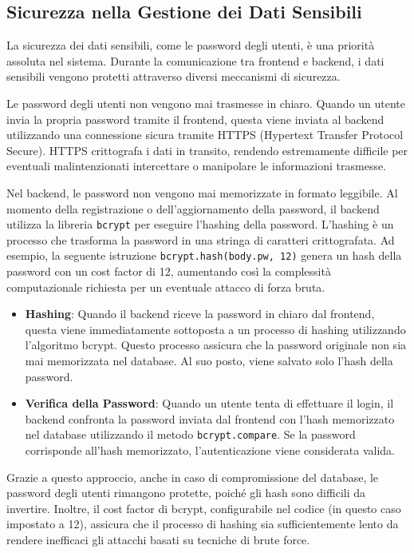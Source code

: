 \documentclass[twoside]{supsistudent}
\begin{document}
\subsection{Sicurezza nella Gestione dei Dati Sensibili}

La sicurezza dei dati sensibili, come le password degli utenti, è una priorità assoluta nel sistema. Durante la comunicazione tra frontend e backend, i dati sensibili vengono protetti attraverso diversi meccanismi di sicurezza.

Le password degli utenti non vengono mai trasmesse in chiaro. Quando un utente invia la propria password tramite il frontend, questa viene inviata al backend utilizzando una connessione sicura tramite HTTPS (Hypertext Transfer Protocol Secure). HTTPS crittografa i dati in transito, rendendo estremamente difficile per eventuali malintenzionati intercettare o manipolare le informazioni trasmesse.

Nel backend, le password non vengono mai memorizzate in formato leggibile. Al momento della registrazione o dell'aggiornamento della password, il backend utilizza la libreria \texttt{bcrypt} per eseguire l'hashing della password. L'hashing è un processo che trasforma la password in una stringa di caratteri crittografata. Ad esempio, la seguente istruzione \texttt{bcrypt.hash(body.pw, 12)} genera un hash della password con un cost factor di 12, aumentando così la complessità computazionale richiesta per un eventuale attacco di forza bruta.

\begin{itemize}
  \item \textbf{Hashing}: Quando il backend riceve la password in chiaro dal frontend, questa viene immediatamente sottoposta a un processo di hashing utilizzando l'algoritmo bcrypt. Questo processo assicura che la password originale non sia mai memorizzata nel database. Al suo posto, viene salvato solo l'hash della password.

  \item \textbf{Verifica della Password}: Quando un utente tenta di effettuare il login, il backend confronta la password inviata dal frontend con l'hash memorizzato nel database utilizzando il metodo \texttt{bcrypt.compare}. Se la password corrisponde all'hash memorizzato, l'autenticazione viene considerata valida.
\end{itemize}

Grazie a questo approccio, anche in caso di compromissione del database, le password degli utenti rimangono protette, poiché gli hash sono difficili da invertire. Inoltre, il cost factor di bcrypt, configurabile nel codice (in questo caso impostato a 12), assicura che il processo di hashing sia sufficientemente lento da rendere inefficaci gli attacchi basati su tecniche di brute force.
\end{document}
